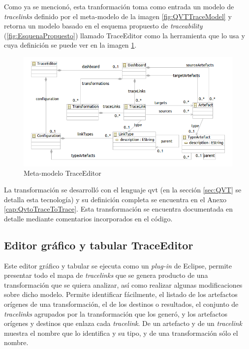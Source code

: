 \documentclass[a4paper,12pt,oneside,spanish]{book}
\begin{document}
Como ya se mencionó, esta tranformación toma como entrada un modelo de \textit{tracelinks} definido por el meta-modelo de la imagen \ref{fig:QVTTraceModel} y retorna un modelo basado en el esquema propuesto de \textit{traceability} (\ref{fig:EsquenaPropuesto}) llamado \textsf{TraceEditor} como la herramienta que lo usa y cuya definición se puede ver en la imagen \ref{fig:TraceEditorMetaModel}.


\begin{figure}[hbtp]
\centering
\includegraphics[scale=.61]{./img/TraceEditorMetaModel}
\caption{Meta-modelo TraceEditor}
\label{fig:TraceEditorMetaModel}
\end{figure}


La transformación se desarrolló con el lenguaje \gls{qvt} (en la sección \ref{sec:QVT} se detalla esta tecnología) y su definición completa se encuentra en el Anexo \ref{cap:QvtoTraceToTrace}. Esta transformación se encuentra documentada en detalle mediante comentarios incorporados en el código.



\subsection{Editor gráfico y tabular TraceEditor}

Este editor gráfico y tabular se ejecuta como un \textit{plug-in} de \textsf{Eclipse}, permite presentar todo el mapa de \textit{tracelinks} que se genera producto de una transformación que se quiera analizar, así como realizar algunas modificaciones sobre dicho modelo. Permite identificar fácilmente, el listado de los artefactos orígenes de una transformación, el de los destinos o resultados, el conjunto de \textit{tracelinks} agrupados por la transformación que los generó, y los artefactos orígenes y destinos que enlaza cada \textit{tracelink}. De un artefacto y de un \textit{tracelink} muestra el nombre que lo identifica y su tipo, y de una transformación sólo el nombre.
\end{document}
